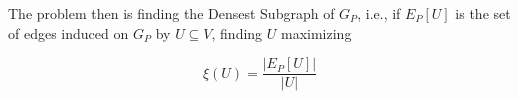 


The problem then is finding the Densest Subgraph of $G_P$, i.e., if $E_{P} [U]$
is the set of edges induced on $G_P$ by $U \subseteq V$, finding $U$ maximizing

\begin{equation}
	\xi(U) = \frac{|E_{P} [U]|}{|U|}
\end{equation}

